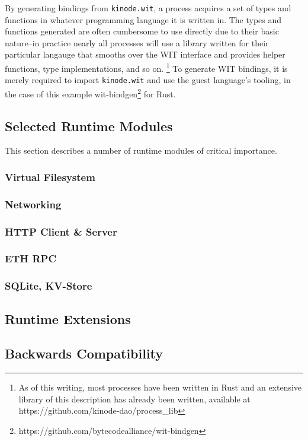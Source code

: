 \documentclass[runningheads]{llncs}
\begin{document}
By generating bindings from \verb|kinode.wit|, a process acquires a set of types and functions in whatever programming language it is written in.
The types and functions generated are often cumbersome to use directly due to their basic nature–in practice nearly all processes will use a library written for their particular langauge that smooths over the WIT interface and provides helper functions, type implementations, and so on.
\footnote{ As of this writing, most processes have been written in Rust and an extensive library of this description has already been written, available at https://github.com/kinode-dao/process\_lib }
To generate WIT bindings, it is merely required to import \verb|kinode.wit| and use the guest language's tooling, in the case of this example wit-bindgen\footnote{https://github.com/bytecodealliance/wit-bindgen} for Rust.

\subsection{Selected Runtime Modules}

This section describes a number of runtime modules of critical importance.

\subsubsection{Virtual Filesystem}
\subsubsection{Networking}
\subsubsection{HTTP Client \& Server}
\subsubsection{ETH RPC}
\subsubsection{SQLite, KV-Store}
\subsection{Runtime Extensions}
\subsection{Backwards Compatibility}
\end{document}
